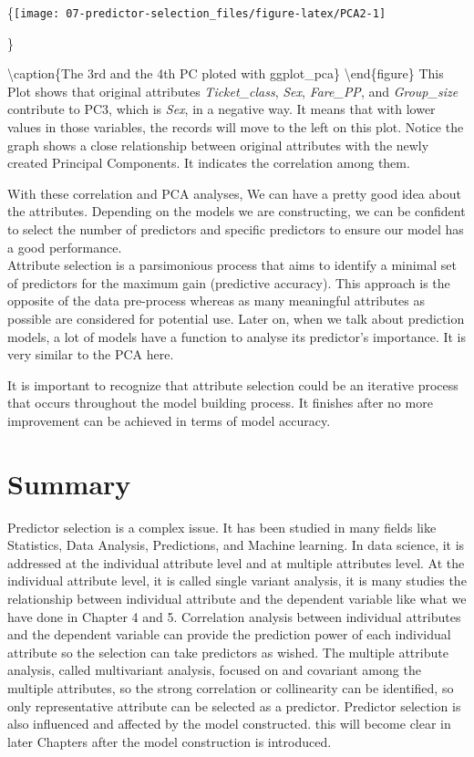 \documentclass[
]{book}
\begin{document}
\{\centering \texttt{[image: 07-predictor-selection\_files/figure-latex/PCA2-1]}

\}

\textbackslash caption\{The 3rd and the 4th PC ploted with ggplot\_pca\}\label{fig:PCA2}
\textbackslash end\{figure\}
This Plot shows that original attributes \emph{Ticket\_class}, \emph{Sex}, \emph{Fare\_PP}, and \emph{Group\_size} contribute to PC3, which is \emph{Sex}, in a negative way. It means that with lower values in those variables, the records will move to the left on this plot. Notice the graph shows a close relationship between original attributes with the newly created Principal Components. It indicates the correlation among them.

With these correlation and PCA analyses, We can have a pretty good idea about the attributes. Depending on the models we are constructing, we can be confident to select the number of predictors and specific predictors to ensure our model has a good performance.\\
Attribute selection is a parsimonious process that aims to identify a minimal set of predictors for the maximum gain (predictive accuracy). This approach is the opposite of the data pre-process whereas as many meaningful attributes as possible are considered for potential use.
Later on, when we talk about prediction models, a lot of models have a function to analyse its predictor's importance. It is very similar to the PCA here.

It is important to recognize that attribute selection could be an iterative process that occurs throughout the model building process. It finishes after no more improvement can be achieved in terms of model accuracy.

\hypertarget{summary-5}{%
\section*{Summary}\label{summary-5}}


Predictor selection is a complex issue. It has been studied in many fields like Statistics, Data Analysis, Predictions, and Machine learning. In data science, it is addressed at the individual attribute level and at multiple attributes level. At the individual attribute level, it is called single variant analysis, it is many studies the relationship between individual attribute and the dependent variable like what we have done in Chapter 4 and 5. Correlation analysis between individual attributes and the dependent variable can provide the prediction power of each individual attribute so the selection can take predictors as wished. The multiple attribute analysis, called multivariant analysis, focused on and covariant among the multiple attributes, so the strong correlation or collinearity can be identified, so only representative attribute can be selected as a predictor. Predictor selection is also influenced and affected by the model constructed. this will become clear in later Chapters after the model construction is introduced.
\end{document}
